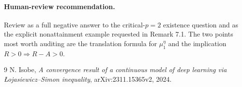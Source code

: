 \documentclass[11pt]{article}
\begin{document}
\paragraph{Human-review recommendation.}
Review as a full negative answer to the critical-\(p=2\) existence question
and as the explicit nonattainment example requested in Remark 7.1. The two
points most worth auditing are the translation formula for \(\mu_1^\eta\) and
the implication \(R>0\Rightarrow R-A>0\).

\begin{thebibliography}{9}
N. Isobe,
\emph{A convergence result of a continuous model of deep learning via
\L{}ojasiewicz--Simon inequality},
arXiv:2311.15365v2, 2024.
\end{thebibliography}
\end{document}
